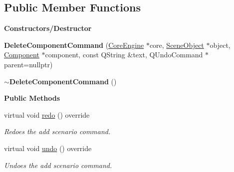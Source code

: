 \subsection*{Public Member Functions}
\begin{Indent}\textbf{ Constructors/\+Destructor}\par
\begin{DoxyCompactItemize}
\item 
\mbox{\label{classrev_1_1_delete_component_command_a871b37b8131e9be0d8e23fd53b50fd66}} 
{\bfseries Delete\+Component\+Command} (\mbox{\hyperlink{classrev_1_1_core_engine}{Core\+Engine}} $\ast$core, \mbox{\hyperlink{classrev_1_1_scene_object}{Scene\+Object}} $\ast$object, \mbox{\hyperlink{classrev_1_1_component}{Component}} $\ast$component, const Q\+String \&text, Q\+Undo\+Command $\ast$parent=nullptr)
\item 
\mbox{\label{classrev_1_1_delete_component_command_a6f475c07baf9ff68ff5f4aedb2919873}} 
{\bfseries $\sim$\+Delete\+Component\+Command} ()
\end{DoxyCompactItemize}
\end{Indent}
\begin{Indent}\textbf{ Public Methods}\par
\begin{DoxyCompactItemize}
\item 
\mbox{\label{classrev_1_1_delete_component_command_aedf38bd7f5d4d10202855ca5c6307c93}} 
virtual void \mbox{\hyperlink{classrev_1_1_delete_component_command_aedf38bd7f5d4d10202855ca5c6307c93}{redo}} () override
\begin{DoxyCompactList}\small\item\em Redoes the add scenario command. \end{DoxyCompactList}\item 
\mbox{\label{classrev_1_1_delete_component_command_a5391877014769b8f7272119ccc533cab}} 
virtual void \mbox{\hyperlink{classrev_1_1_delete_component_command_a5391877014769b8f7272119ccc533cab}{undo}} () override
\begin{DoxyCompactList}\small\item\em Undoes the add scenario command. \end{DoxyCompactList}\end{DoxyCompactItemize}
\end{Indent}
